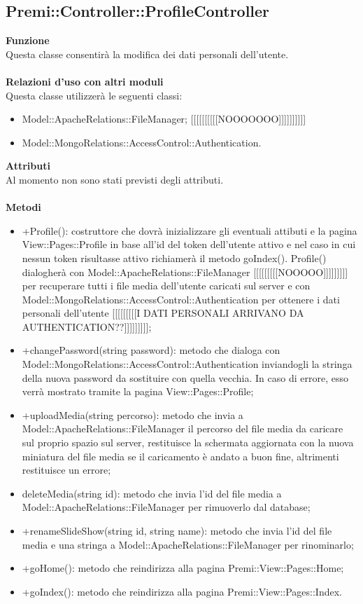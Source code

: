 {				\subsection{Premi::Controller::ProfileController}{
					\textbf{Funzione}\\
					\indent Questa classe consentirà la modifica dei dati personali dell'utente.\\\\
					\textbf{Relazioni d'uso con altri moduli}\\
					\indent Questa classe utilizzerà le seguenti classi:
					\begin{itemize}
						\item Model::ApacheRelations::FileManager; [[[[[[[[[[NOOOOOOO]]]]]]]]]]
						\item Model::MongoRelations::AccessControl::Authentication.
					\end{itemize}
					\textbf{Attributi}\\
					\indent Al momento non sono stati previsti degli attributi.\\\\
					\textbf{Metodi}
					\begin{itemize}
						\item +Profile(): costruttore che dovrà inizializzare gli eventuali attibuti e la pagina View::Pages::Profile in base all'id del token dell'utente attivo e nel caso in cui nessun token risultasse attivo richiamerà il metodo goIndex(). Profile() dialogherà con Model::ApacheRelations::FileManager [[[[[[[[[NOOOOO]]]]]]]]] per recuperare tutti i file media dell'utente caricati sul server e con Model::MongoRelations::AccessControl::Authentication per ottenere i dati personali dell'utente [[[[[[[[[I DATI PERSONALI ARRIVANO DA AUTHENTICATION??]]]]]]]]];
						\item +changePassword(string password): metodo che dialoga con Model::MongoRelations::AccessControl::Authentication inviandogli la stringa della nuova password da sostituire con quella vecchia. In caso di errore, esso verrà mostrato tramite la pagina View::Pages::Profile;
						\item +uploadMedia(string percorso): metodo che invia a Model::ApacheRelations::FileManager il percorso del file media da caricare sul proprio spazio sul server, restituisce la schermata aggiornata con la nuova miniatura del file media se il caricamento è andato a buon fine, altrimenti restituisce un errore;
						\item deleteMedia(string id): metodo che invia l'id del file media a Model::ApacheRelations::FileManager per rimuoverlo dal database;
						\item +renameSlideShow(string id, string name): metodo che invia l'id del file media e una stringa a Model::ApacheRelations::FileManager per rinominarlo;
						\item +goHome(): metodo che reindirizza alla pagina Premi::View::Pages::Home;
						\item +goIndex(): metodo che reindirizza alla pagina Premi::View::Pages::Index.
					\end{itemize}
				}
}
